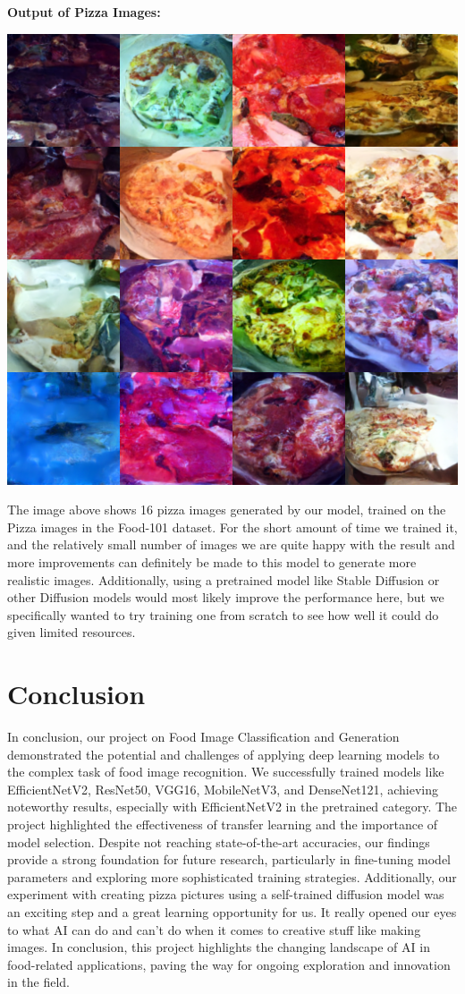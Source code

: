 \documentclass{article}
\begin{document}
\textbf{Output of Pizza Images:}

\begin{center}
    \includegraphics[width=0.7\linewidth, height=0.6\linewidth]{images/generated-pizza-images.png}
\end{center}

The image above shows 16 pizza images generated by our model, trained on the Pizza images in the Food-101 dataset. For the short amount of time we trained it, and the relatively small number of images we are quite happy with the result and more improvements can definitely be made to this model to generate more realistic images. Additionally, using a pretrained model like Stable Diffusion or other Diffusion models would most likely improve the performance here, but we specifically wanted to try training one from scratch to see how well it could do given limited resources.

\section{Conclusion}

In conclusion, our project on Food Image Classification and Generation demonstrated the potential and challenges of applying deep learning models to the complex task of food image recognition. We successfully trained models like EfficientNetV2, ResNet50, VGG16, MobileNetV3, and DenseNet121, achieving noteworthy results, especially with EfficientNetV2 in the pretrained category. The project highlighted the effectiveness of transfer learning and the importance of model selection. Despite not reaching state-of-the-art accuracies, our findings provide a strong foundation for future research, particularly in fine-tuning model parameters and exploring more sophisticated training strategies.  Additionally, our experiment with creating pizza pictures using a self-trained diffusion model was an exciting step and a great learning opportunity for us. It really opened our eyes to what AI can do and can't do when it comes to creative stuff like making images. In conclusion, this project highlights the changing landscape of AI in food-related applications, paving the way for ongoing exploration and innovation in the field.
\end{document}
